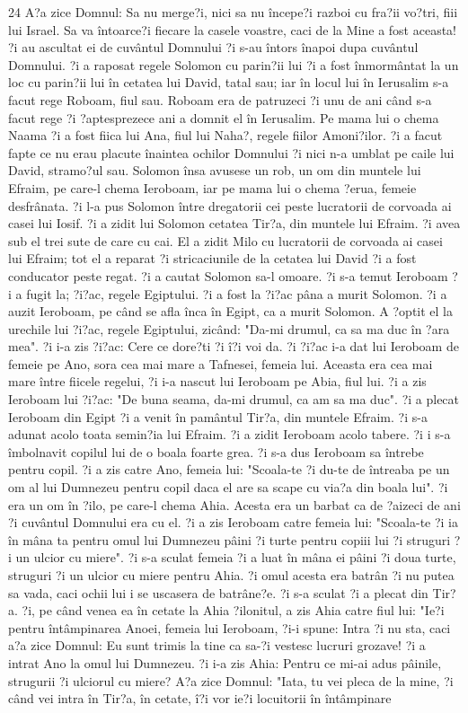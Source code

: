 \par 24 A?a zice Domnul: Sa nu merge?i, nici sa nu începe?i razboi cu fra?ii vo?tri, fiii lui Israel. Sa va întoarce?i fiecare la casele voastre, caci de la Mine a fost aceasta! ?i au ascultat ei de cuvântul Domnului ?i s-au întors înapoi dupa cuvântul Domnului. ?i a raposat regele Solomon cu parin?ii lui ?i a fost înmormântat la un loc cu parin?ii lui în cetatea lui David, tatal sau; iar în locul lui în Ierusalim s-a facut rege Roboam, fiul sau. Roboam era de patruzeci ?i unu de ani când s-a facut rege ?i ?aptesprezece ani a domnit el în Ierusalim. Pe mama lui o chema Naama ?i a fost fiica lui Ana, fiul lui Naha?, regele fiilor Amoni?ilor. ?i a facut fapte ce nu erau placute înaintea ochilor Domnului ?i nici n-a umblat pe caile lui David, stramo?ul sau. Solomon însa avusese un rob, un om din muntele lui Efraim, pe care-l chema Ieroboam, iar pe mama lui o chema ?erua, femeie desfrânata. ?i l-a pus Solomon între dregatorii cei peste lucratorii de corvoada ai casei lui Iosif. ?i a zidit lui Solomon cetatea Tir?a, din muntele lui Efraim. ?i avea sub el trei sute de care cu cai. El a zidit Milo cu lucratorii de corvoada ai casei lui Efraim; tot el a reparat ?i stricaciunile de la cetatea lui David ?i a fost conducator peste regat. ?i a cautat Solomon sa-l omoare. ?i s-a temut Ieroboam ?i a fugit la; ?i?ac, regele Egiptului. ?i a fost la ?i?ac pâna a murit Solomon. ?i a auzit Ieroboam, pe când se afla înca în Egipt, ca a murit Solomon. A ?optit el la urechile lui ?i?ac, regele Egiptului, zicând: "Da-mi drumul, ca sa ma duc în ?ara mea". ?i i-a zis ?i?ac: Cere ce dore?ti ?i î?i voi da. ?i ?i?ac i-a dat lui Ieroboam de femeie pe Ano, sora cea mai mare a Tafnesei, femeia lui. Aceasta era cea mai mare între fiicele regelui, ?i i-a nascut lui Ieroboam pe Abia, fiul lui. ?i a zis Ieroboam lui ?i?ac: "De buna seama, da-mi drumul, ca am sa ma duc". ?i a plecat Ieroboam din Egipt ?i a venit în pamântul Tir?a, din muntele Efraim. ?i s-a adunat acolo toata semin?ia lui Efraim. ?i a zidit Ieroboam acolo tabere. ?i i s-a îmbolnavit copilul lui de o boala foarte grea. ?i s-a dus Ieroboam sa întrebe pentru copil. ?i a zis catre Ano, femeia lui: "Scoala-te ?i du-te de întreaba pe un om al lui Dumnezeu pentru copil daca el are sa scape cu via?a din boala lui". ?i era un om în ?ilo, pe care-l chema Ahia. Acesta era un barbat ca de ?aizeci de ani ?i cuvântul Domnului era cu el. ?i a zis Ieroboam catre femeia lui: "Scoala-te ?i ia în mâna ta pentru omul lui Dumnezeu pâini ?i turte pentru copiii lui ?i struguri ?i un ulcior cu miere". ?i s-a sculat femeia ?i a luat în mâna ei pâini ?i doua turte, struguri ?i un ulcior cu miere pentru Ahia. ?i omul acesta era batrân ?i nu putea sa vada, caci ochii lui i se uscasera de batrâne?e. ?i s-a sculat ?i a plecat din Tir?a. ?i, pe când venea ea în cetate la Ahia ?ilonitul, a zis Ahia catre fiul lui: "Ie?i pentru întâmpinarea Anoei, femeia lui Ieroboam, ?i-i spune: Intra ?i nu sta, caci a?a zice Domnul: Eu sunt trimis la tine ca sa-?i vestesc lucruri grozave! ?i a intrat Ano la omul lui Dumnezeu. ?i i-a zis Ahia: Pentru ce mi-ai adus pâinile, strugurii ?i ulciorul cu miere? A?a zice Domnul: "Iata, tu vei pleca de la mine, ?i când vei intra în Tir?a, în cetate, î?i vor ie?i locuitorii în întâmpinare 